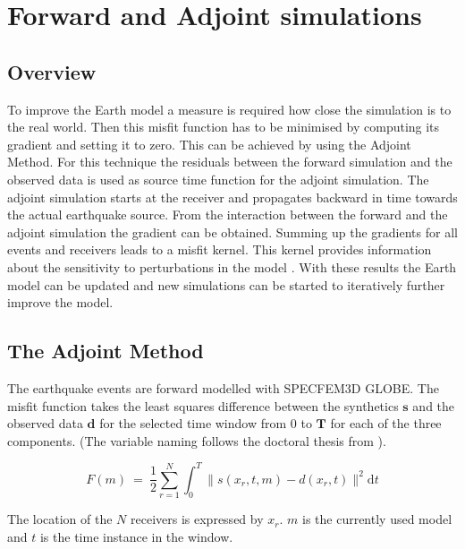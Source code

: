 \chapter{Forward and Adjoint simulations}


\section{Overview}
To improve the Earth model a measure is required how close the simulation is to the real world. 
Then this misfit function has to be minimised by computing its gradient and setting it to zero. 
This can be achieved by using the Adjoint Method. For this technique the residuals between the forward simulation and the observed 
data is used as source time function %
for the adjoint simulation. 
The adjoint simulation starts at the receiver and propagates backward in time towards the actual earthquake source.
From the interaction between the forward and the adjoint simulation the gradient can be obtained. 
Summing up the gradients for all events and receivers leads to a misfit kernel. 
This kernel provides information about the sensitivity to perturbations in the model \citep{Magnoni2012}.
With these results the Earth model can be updated and new simulations can be started to iteratively further improve the model.


\section{The Adjoint Method}

The earthquake events are forward modelled with SPECFEM3D GLOBE. 
The misfit function takes the least squares difference between the synthetics $\boldsymbol{s}$ and the 
observed data $\boldsymbol{d}$ for the selected time window from $0$ to $\boldsymbol{T}$ for each of the three components. 
(The variable naming follows the doctoral thesis from \citealp{Magnoni2012}).

\begin{equation}
F(m) \ = \ \frac{1}{2} \sum_{r=1}^N \int_0^T \lVert  s(x_r, t, m) - d(x_r, t)  \lVert^2  \mathrm{d}t
\end{equation}

The location of the $N$ receivers is expressed by $x_r$. $m$ is the currently used model and $t$ is the time instance in the window.



